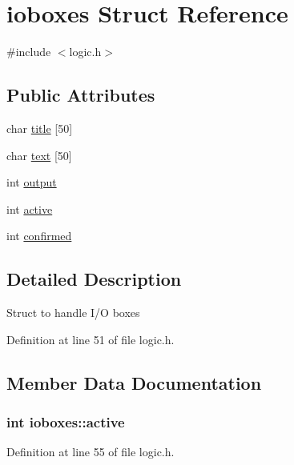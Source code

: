 \hypertarget{structioboxes}{}\section{ioboxes Struct Reference}
\label{structioboxes}


{\ttfamily \#include $<$logic.\+h$>$}

\subsection*{Public Attributes}
\begin{DoxyCompactItemize}
\item 
char \hyperlink{structioboxes_a7200fd3d80c895bea1490cd072e0eaf4}{title} \mbox{[}50\mbox{]}
\item 
char \hyperlink{structioboxes_aedeafb3de01e9468572e7bf9d3f55c5e}{text} \mbox{[}50\mbox{]}
\item 
int \hyperlink{structioboxes_aa9f8e1e6ba24677cb35583e4b49ea9f1}{output}
\item 
int \hyperlink{structioboxes_a8deb44c1b202d889014ffa8d0b24ac78}{active}
\item 
int \hyperlink{structioboxes_a7f44b3d4da57b13490433734630c2a22}{confirmed}
\end{DoxyCompactItemize}


\subsection{Detailed Description}
Struct to handle I/\+O boxes 

Definition at line 51 of file logic.\+h.



\subsection{Member Data Documentation}
\hypertarget{structioboxes_a8deb44c1b202d889014ffa8d0b24ac78}{}
\subsubsection[{active}]{\setlength{\rightskip}{0pt plus 5cm}int ioboxes\+::active}\label{structioboxes_a8deb44c1b202d889014ffa8d0b24ac78}


Definition at line 55 of file logic.\+h.

\hypertarget{structioboxes_a7f44b3d4da57b13490433734630c2a22}{}
